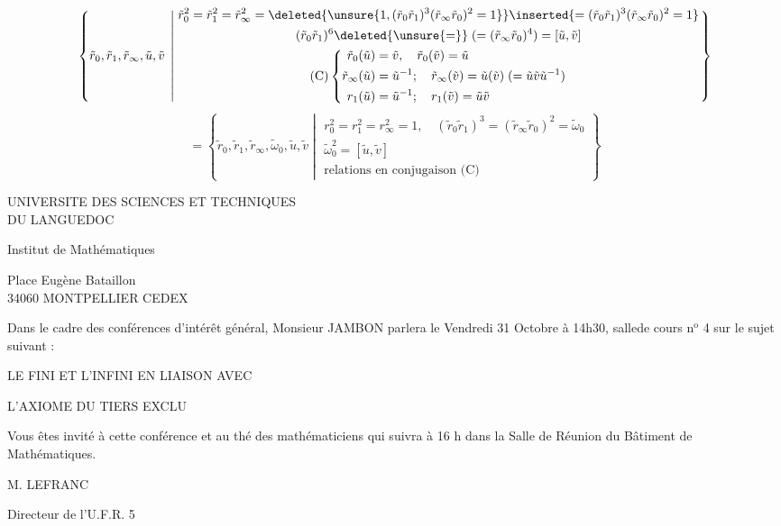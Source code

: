 \[
\left\{\tilde r_0,\tilde r_1,\tilde r_\infty,\tilde u,\tilde v\;\left|\;
\begin{gathered}
\tilde r_0^2=\tilde r_1^2=\tilde r_\infty^2=
\deleted{\unsure{1,(\tilde r_0\tilde r_1)^3(\tilde r_\infty\tilde r_0)^2=1}}
\inserted{=(\tilde r_0\tilde r_1)^3(\tilde r_\infty\tilde r_0)^2=1}\\
(\tilde r_0\tilde r_1)^6\deleted{\unsure{=}}\;(=(\tilde r_\infty\tilde r_0)^4)=[\tilde u,\tilde v]\\
\text{(C)}\left\{\begin{aligned}
\tilde r_0(\tilde u)&=\tilde v,\quad\tilde r_0(\tilde v)=\tilde u\\
\tilde r_\infty(\tilde u)&=\tilde u^{-1};\quad\tilde r_\infty(\tilde v)=\tilde u(\tilde v)\;(=\tilde u\tilde v\tilde u^{-1})\\
r_1(\tilde u)&=\tilde u^{-1};\quad r_1(\tilde v)=\tilde u\tilde v
\end{aligned}\right.
\end{gathered}\right.\right\}
\]
\[
=\left\{\tilde r_0,\tilde r_1,\tilde r_\infty,\tilde\omega_0,\tilde u,\tilde v\;\left|\;
\begin{gathered}
r_0^2=r_1^2=r_\infty^2=1,\quad(\tilde r_0\tilde r_1)^3=(\tilde r_\infty\tilde r_0)^2=\tilde\omega_0\\
\tilde\omega_0^2=[\tilde u,\tilde v]\\
\text{relations en conjugaison (C)}
\end{gathered}\right.\right\}
\]


UNIVERSITE DES SCIENCES ET TECHNIQUES\\
DU LANGUEDOC

Institut de Mathématiques

Place Eugène Bataillon\\
34060 MONTPELLIER CEDEX

Dans le cadre des conférences d'intérêt général, Monsieur JAMBON parlera le Vendredi 31 Octobre à 14h30, sallede cours n$^{\mathrm{o}}$ 4 sur le sujet suivant :

\begin{center}
LE FINI ET L'INFINI EN LIAISON AVEC

L'AXIOME DU TIERS EXCLU
\end{center}

Vous êtes invité à cette conférence et au thé des mathématiciens qui suivra à 16 h dans la Salle de Réunion du Bâtiment de Mathématiques.

\begin{flushright}
M. LEFRANC

Directeur de l'U.F.R. 5
\end{flushright}


